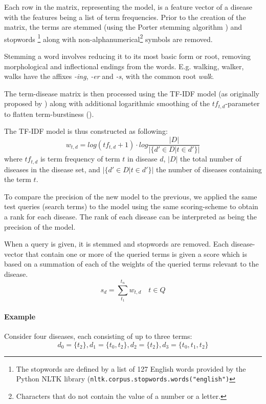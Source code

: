 \documentclass[10pt,letterpaper,two column,final]{article}
\begin{document}

Each row in the matrix, representing the model, is a feature vector of a
disease with the features being a list of term frequencies. Prior to the
creation of the matrix, the terms are stemmed (using the Porter stemming
algorithm \cite{porterstemming}) and stopwords \footnote{The stopwords
are defined by a list of 127 English words provided by the Python NLTK
library (\texttt{nltk.corpus.stopwords.words("english")}} along with
non-alphanumerical\footnote{Characters that do not contain the value of
a number or a letter.} symbols are removed.

Stemming a word involves reducing it to its most basic form or root,
removing morphological and inflectional endings from the words. E.g.
walking, walker, walks have the affixes \textit{-ing}, \textit{-er} and
\textit{-s}, with the common root \textit{walk}.


The term-disease matrix is then processed using the
TF-IDF model (as originally proposed by \cite{tfidf}) along with
additional logarithmic smoothing of the $tf_{t,d}$-parameter to flatten
term-burstiness (\cite{burstiness}).

The TF-IDF model is thus constructed as following:
\[
w_{t,d} = log(tf_{t,d}+1)\cdot log\frac{|D|}{|\{d'\in D|t\in d'\}|}
\]
where $tf_{t,d}$ is term frequency of term $t$ in disease $d$, $|D|$ 
the total number of diseases in the disease set, and $|\{d'\in D|t\in
d'\}|$ the number of diseases containing the term $t$.

To compare the precision of the new model to the previous, we applied
the same test queries (search terms) to the model using the same
scoring-scheme to obtain a rank for each disease. The rank of each
disease can be interpreted as being the precision of the model.

When a query is given, it is stemmed and stopwords are removed. Each
disease-vector that contain one or more of the queried terms is given a
score which is based on a summation of each of the weights of the
queried terms relevant to the disease.
\[
s_{d} = \displaystyle\sum\limits_{t_1}^{t_n} w_{t,d}\quad t \in Q
\]

\paragraph{Example}
Consider four diseases, each consisting of up to three terms:
\[
d_{0} = \{t_{2}\}, d_{1} = \{t_{0}, t_{2} \}, d_{2} = \{t_{2} \}, d_{3} = \{t_{0}, t_{1}, t_{2} \}
\]
\end{document}
